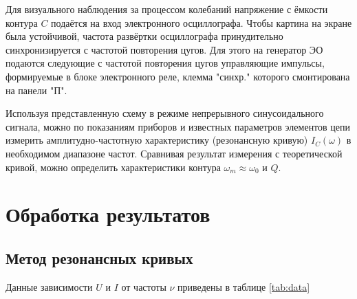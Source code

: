 \documentclass[a4paper, 12pt]{article}
\begin{document}
Для визуального наблюдения за процессом колебаний напряжение с ёмкости контура $C$ подаётся на вход электронного
осциллографа. Чтобы картина на экране была устойчивой, частота развёртки осциллографа принудительно синхронизируется
с частотой повторения цугов. Для этого на генератор ЭО подаются следующие с частотой повторения цугов управляющие 
импульсы, формируемые в блоке электронного реле, клемма "синхр."{} которого смонтирована на панели "П".

Используя представленную схему в режиме непрерывного синусоидального сигнала, можно по показаниям приборов и известных
параметров элементов цепи измерить амплитудно-частотную характеристику (резонансную кривую) $I_C(\omega)$ в необходимом
диапазоне частот. Сравнивая результат измерения с теоретической кривой, можно определить характеристики контура
$\omega_m \approx \omega_0$ и $Q$.

\section{Обработка результатов}

\subsection{Метод резонансных кривых}

Данные зависимости $U$ и $I$ от частоты $\nu$ приведены в таблице \ref{tab:data}
\end{document}
